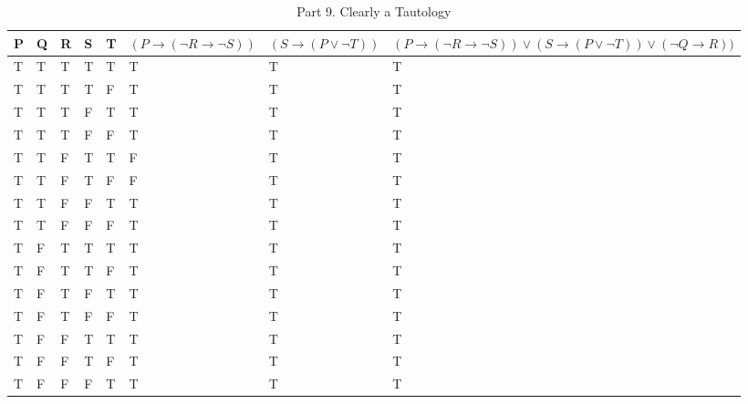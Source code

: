 \documentclass[10.5pt]{article}
\newenvironment{solution}[2][Solution]{ \begin{trivlist}
\item[\hskip \labelsep {\bfseries #1}]}{\end{trivlist}}
\begin{document}
\begin{solution}{2}
\begin{table}[!h]
\centering
\caption{Part 9. Clearly a Tautology}
\label{my-label}
\begin{tabular}{|l|l|l|l|l|l|l|l|}
\hline
P & Q & R & S & T & $(P \rightarrow (\lnot R \rightarrow \lnot S))$ & $(S \rightarrow (P \vee \lnot T))$ & $(P \rightarrow (\lnot R \rightarrow \lnot S)) \vee (S \rightarrow (P \vee \lnot T)) \vee (\lnot Q \rightarrow R))$ \\ \hline
T & T & T & T & T & T & T & T                                                                    \\ \hline
T & T & T & T & F & T & T & T                                                                    \\ \hline
T & T & T & F & T & T & T & T                                                                    \\ \hline
T & T & T & F & F & T & T & T                                                                    \\ \hline
T & T & F & T & T & F & T & T                                                                    \\ \hline
T & T & F & T & F & F & T & T                                                                    \\ \hline
T & T & F & F & T & T & T & T                                                                    \\ \hline
T & T & F & F & F & T & T & T                                                                    \\ \hline
T & F & T & T & T & T & T & T                                                                    \\ \hline
T & F & T & T & F & T & T & T                                                                    \\ \hline
T & F & T & F & T & T & T & T                                                                    \\ \hline
T & F & T & F & F & T & T & T                                                                    \\ \hline
T & F & F & T & T & T & T & T                                                                    \\ \hline
T & F & F & T & F & T & T & T                                                                    \\ \hline
T & F & F & F & T & T & T & T                                                                    \\ \hline

\end{tabular}
\end{table}
\end{solution}
\end{document}
